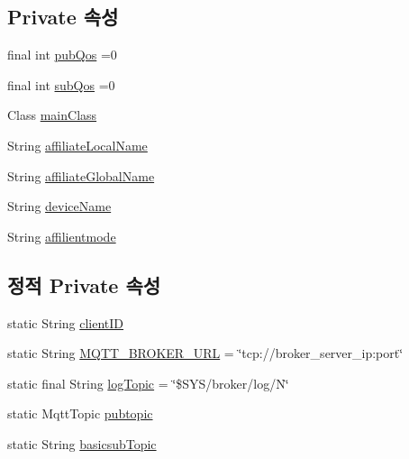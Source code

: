 \subsection*{Private 속성}
\begin{DoxyCompactItemize}
\item 
final int \mbox{\hyperlink{classcom_1_1github_1_1aites_1_1framework_1_1communicate_1_1_data_transfer_a21696e0ac11bb9a9182280f35a453c03}{pub\+Qos}} =0
\item 
final int \mbox{\hyperlink{classcom_1_1github_1_1aites_1_1framework_1_1communicate_1_1_data_transfer_af8b85631e86121433d394d90b2d65eeb}{sub\+Qos}} =0
\item 
Class \mbox{\hyperlink{classcom_1_1github_1_1aites_1_1framework_1_1communicate_1_1_data_transfer_aaf2d39cfff3efab5f33efb759918a3fe}{main\+Class}}
\item 
String \mbox{\hyperlink{classcom_1_1github_1_1aites_1_1framework_1_1communicate_1_1_data_transfer_ab8a15f7b2842b32c96bfedefe974ee59}{affiliate\+Local\+Name}}
\item 
String \mbox{\hyperlink{classcom_1_1github_1_1aites_1_1framework_1_1communicate_1_1_data_transfer_a5333e287369f5f20c62e28cd80fe0398}{affiliate\+Global\+Name}}
\item 
String \mbox{\hyperlink{classcom_1_1github_1_1aites_1_1framework_1_1communicate_1_1_data_transfer_ae64991643e95a242bc9d5dc6819c6301}{device\+Name}}
\item 
String \mbox{\hyperlink{classcom_1_1github_1_1aites_1_1framework_1_1communicate_1_1_data_transfer_a15377742659a03248cb9cbdd4f691386}{affilientmode}}
\end{DoxyCompactItemize}
\subsection*{정적 Private 속성}
\begin{DoxyCompactItemize}
\item 
static String \mbox{\hyperlink{classcom_1_1github_1_1aites_1_1framework_1_1communicate_1_1_data_transfer_a5aa04d84db8a69443856393e4fcaa941}{client\+ID}}
\item 
static String \mbox{\hyperlink{classcom_1_1github_1_1aites_1_1framework_1_1communicate_1_1_data_transfer_a379ab24ad1b3894585dc42b93a1ab612}{M\+Q\+T\+T\+\_\+\+B\+R\+O\+K\+E\+R\+\_\+\+U\+RL}} = \char`\"{}tcp\+://broker\+\_\+server\+\_\+ip\+:port\char`\"{}
\item 
static final String \mbox{\hyperlink{classcom_1_1github_1_1aites_1_1framework_1_1communicate_1_1_data_transfer_a81028188163bdeaf3afdd9afe335a024}{log\+Topic}} = \char`\"{}\$S\+YS/broker/log/N\char`\"{}
\item 
static Mqtt\+Topic \mbox{\hyperlink{classcom_1_1github_1_1aites_1_1framework_1_1communicate_1_1_data_transfer_a84a8e23d7f7ed8af50ede665f226403b}{pubtopic}}
\item 
static String \mbox{\hyperlink{classcom_1_1github_1_1aites_1_1framework_1_1communicate_1_1_data_transfer_a0b644afb1ba2329f302a84a4ca2b8343}{basicsub\+Topic}}
\end{DoxyCompactItemize}


